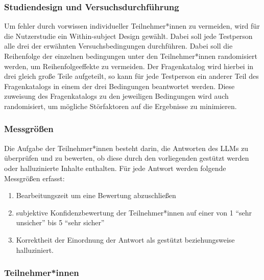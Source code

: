 \subsubsection{Studiendesign und Versuchsdurchführung}
Um fehler durch vorwissen individueller Teilnehmer*innen zu vermeiden, wird für die Nutzerstudie ein Within-subject Design gewählt. Dabei soll jede Testperson alle drei der erwähnten Versuchsbedingungen durchführen. Dabei soll die Reihenfolge der einzelnen bedingungen unter den Teilnehmer*innen randomisiert werden, um Reihenfolgeeffekte zu vermeiden. \newline \noindent
Der Fragenkatalog wird hierbei in drei gleich große Teile aufgeteilt, so kann für jede Testperson ein anderer Teil des Fragenkatalogs in einem der drei Bedingungen beantwortet werden. Diese zuweisung des Fragenkatalogs zu den jeweiligen Bedingungen wird auch randomisiert, um mögliche Störfaktoren auf die Ergebnisse zu minimieren. \noindent





\subsubsection{Messgrößen}
Die Aufgabe der Teilnehmer*innen besteht darin, die Antworten des LLMs zu überprüfen und zu bewerten, ob diese durch den vorliegenden gestützt werden oder halluzinierte Inhalte enthalten.
Für jede Antwort werden folgende Messgrößen erfasst:
\begin{enumerate}
    \item Bearbeitungszeit um eine Bewertung abzuschließen
    \item subjektive Konfidenzbewertung der Teilnehmer*innen auf einer von 1 \enquote{sehr unsicher} bis 5 \enquote{sehr sicher} \cite{robinsonUsingMultiitemPsychometric2018}
    \item Korrektheit der Einordnung der Antwort als gestützt beziehungsweise halluziniert.
\end{enumerate}

\subsubsection{Teilnehmer*innen}









